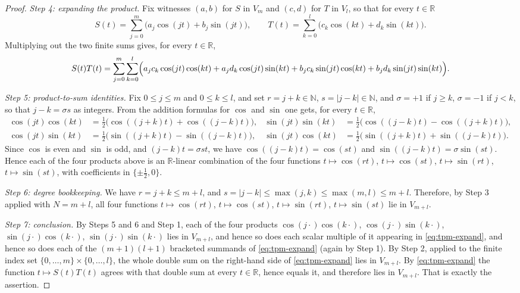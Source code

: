 \begin{proof}
\emph{Step 4: expanding the product.} Fix witnesses $(a,b)$ for $S$ in $V_m$ and
$(c,d)$ for $T$ in $V_l$, so that for every $t\in\mathbb{R}$
\[
  S(t)=\sum_{j=0}^{m}\bigl(a_j\cos(jt)+b_j\sin(jt)\bigr),\qquad
  T(t)=\sum_{k=0}^{l}\bigl(c_k\cos(kt)+d_k\sin(kt)\bigr).
\]
Multiplying out the two finite sums gives, for every $t\in\mathbb{R}$,
\begin{equation}\label{eq:tpm-expand}
  S(t)T(t)=\sum_{j=0}^{m}\sum_{k=0}^{l}\Bigl(
    a_jc_k\cos(jt)\cos(kt)+a_jd_k\cos(jt)\sin(kt)
   +b_jc_k\sin(jt)\cos(kt)+b_jd_k\sin(jt)\sin(kt)\Bigr).
\end{equation}

\emph{Step 5: product-to-sum identities.} Fix $0\le j\le m$ and $0\le k\le l$,
and set $r=j+k\in\mathbb{N}$, $s=\lvert j-k\rvert\in\mathbb{N}$, and
$\sigma=+1$ if $j\ge k$, $\sigma=-1$ if $j<k$, so that $j-k=\sigma s$ as
integers. From the addition formulas for $\cos$ and $\sin$ one gets, for every
$t\in\mathbb{R}$,
\begin{align*}
  \cos(jt)\cos(kt)&=\tfrac12\bigl(\cos((j+k)t)+\cos((j-k)t)\bigr),&
  \sin(jt)\sin(kt)&=\tfrac12\bigl(\cos((j-k)t)-\cos((j+k)t)\bigr),\\
  \cos(jt)\sin(kt)&=\tfrac12\bigl(\sin((j+k)t)-\sin((j-k)t)\bigr),&
  \sin(jt)\cos(kt)&=\tfrac12\bigl(\sin((j+k)t)+\sin((j-k)t)\bigr).
\end{align*}
Since $\cos$ is even and $\sin$ is odd, and $(j-k)t=\sigma st$, we have
$\cos((j-k)t)=\cos(st)$ and $\sin((j-k)t)=\sigma\sin(st)$. Hence each of the
four products above is an $\mathbb{R}$-linear combination of the four functions
$t\mapsto\cos(rt)$, $t\mapsto\cos(st)$, $t\mapsto\sin(rt)$,
$t\mapsto\sin(st)$, with coefficients in $\{\pm\tfrac12,0\}$.

\emph{Step 6: degree bookkeeping.} We have $r=j+k\le m+l$, and
$s=\lvert j-k\rvert\le\max(j,k)\le\max(m,l)\le m+l$. Therefore, by Step 3
applied with $N=m+l$, all four functions $t\mapsto\cos(rt)$,
$t\mapsto\cos(st)$, $t\mapsto\sin(rt)$, $t\mapsto\sin(st)$ lie in $V_{m+l}$.

\emph{Step 7: conclusion.} By Steps 5 and 6 and Step 1, each of the four
products $\cos(j\cdot)\cos(k\cdot)$, $\cos(j\cdot)\sin(k\cdot)$,
$\sin(j\cdot)\cos(k\cdot)$, $\sin(j\cdot)\sin(k\cdot)$ lies in $V_{m+l}$, and
hence so does each scalar multiple of it appearing in
\eqref{eq:tpm-expand}, and hence so does each of the $(m+1)(l+1)$ bracketed
summands of \eqref{eq:tpm-expand} (again by Step 1). By Step 2, applied to the
finite index set $\{0,\dots,m\}\times\{0,\dots,l\}$, the whole double sum on the
right-hand side of \eqref{eq:tpm-expand} lies in $V_{m+l}$. By
\eqref{eq:tpm-expand} the function $t\mapsto S(t)T(t)$ agrees with that double
sum at every $t\in\mathbb{R}$, hence equals it, and therefore lies in
$V_{m+l}$. That is exactly the assertion.
\end{proof}
